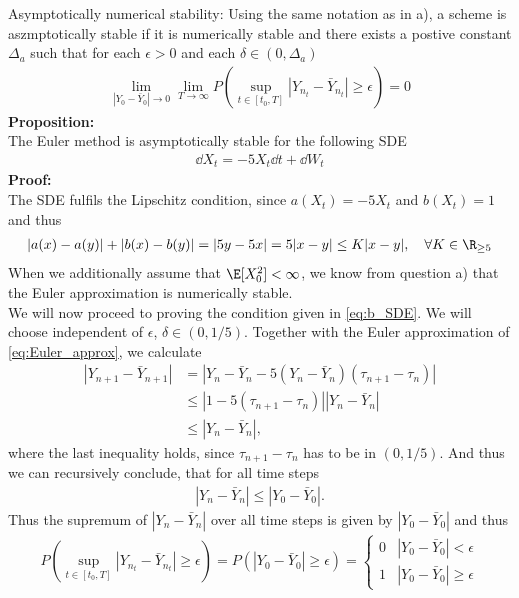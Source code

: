 Asymptotically numerical stability: Using the same notation as in a), a scheme is aszmptotically stable if it is numerically stable and there exists a postive constant $\Delta_a$ such that for each $\epsilon>0$ and each $\delta\in(0,\Delta_a)$
\begin{align}
\lim_{|Y_0-\bar{Y}_0|\rightarrow 0}\lim_{T\rightarrow \infty} P\left(\sup_{t\in[t_0,T]}|Y_{n_t}-\bar{Y}_{n_t}|\geq \epsilon\right) =0 \label{eq:b_as_stab_cond}
\end{align}
\textbf{Proposition:} \\
The Euler method is asymptotically stable for the following SDE
\begin{align}
\dd X_t = -5 X_t \dd t +\dd W_t \label{eq:b_SDE}
\end{align}
\textbf{Proof:}\\
The SDE fulfils the Lipschitz condition, since $a(X_t) = -5X_t$ and $b(X_t)=1$ and thus
\begin{align}
|a(x)-a(y)|+|b(x)-b(y)| = |5y-5x| = 5 |x-y|\leq K |x-y|, \quad \forall K \in \R_{\geq 5}
\end{align}
When we additionally assume that $\E[X_0^2]<\infty$, we know from question a) that the Euler approximation is numerically stable.\\ 
We will now proceed to proving the condition given in \cref{eq:b_SDE}. We will choose independent of $\epsilon$, $\delta \in (0,1/5)$.
Together with the Euler approximation of \cref{eq:Euler_approx}, we calculate
\begin{align}
|Y_{n+1}-\bar{Y}_{n+1}| &= |Y_n-\bar{Y}_n-5(Y_n-\bar{Y}_n)(\tau_{n+1}-\tau_n)|\\
&\leq |1-5(\tau_{n+1}-\tau_n)||Y_n-\bar{Y}_n|\\
&\leq |Y_n-\bar{Y}_n|,
\end{align}
where the last inequality holds, since $\tau_{n+1}-\tau_n$ has to be in $(0,1/5)$. And thus we can recursively conclude, that for all time steps
\begin{align}
|Y_n-\bar{Y}_n|\leq |Y_0-\bar{Y}_0|.
\end{align}
Thus the supremum of $|Y_n-\bar{Y}_n|$  over all time steps is given by $|Y_0-\bar{Y}_0|$ and thus
\begin{align}
 P\left(\sup_{t\in[t_0,T]}|Y_{n_t}-\bar{Y}_{n_t}|\geq \epsilon\right)  =  P\left(|Y_{0}-\bar{Y}_{0}|\geq \epsilon\right)
 = \begin{cases} 
      0 &  |Y_{0}-\bar{Y}_{0}| < \epsilon\\
     1& |Y_{0}-\bar{Y}_{0}|\geq \epsilon
   \end{cases}
\end{align}
